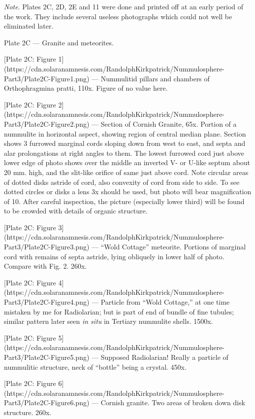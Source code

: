 \documentclass[a4paper, 12pt, oneside]{article}
\begin{document}
\emph{Note}. Plates 2C, 2D, 2E and 11 were done and printed off at an early period of the work. They include several useless photographs which could not well be eliminated later.

Plate 2C --- Granite and meteorites.

[Plate 2C: Figure 1](https://cdn.solaranamnesis.com/RandolphKirkpatrick/Nummulosphere-Part3/Plate2C-Figure1.png) --- Nummulitid pillars and chambers of Orthophragmina pratti, 110x. Figure of no value here.

[Plate 2C: Figure 2](https://cdn.solaranamnesis.com/RandolphKirkpatrick/Nummulosphere-Part3/Plate2C-Figure2.png) --- Section of Cornish Granite, 65x. Portion of a nummulite in horizontal aspect, showing region of central median plane. Section shows 3 furrowed marginal cords sloping down from west to east, and septa and alar prolongations at right angles to them. The lowest furrowed cord just above lower edge of photo shows over the middle an inverted V- or U-like septum about 20 mm. high, and the slit-like orifice of same just above cord. Note circular areas of dotted disks astride of cord, also convexity of cord from side to side. To see dotted circles or disks a lens 3x should be used, but photo will bear magnification of 10. After careful inspection, the picture (especially lower third) will be found to be crowded with details of organic structure.

[Plate 2C: Figure 3](https://cdn.solaranamnesis.com/RandolphKirkpatrick/Nummulosphere-Part3/Plate2C-Figure3.png) --- ``Wold Cottage'' meteorite. Portions of marginal cord with remains of septa astride, lying obliquely in lower half of photo. Compare with Fig. 2. 260x.

[Plate 2C: Figure 4](https://cdn.solaranamnesis.com/RandolphKirkpatrick/Nummulosphere-Part3/Plate2C-Figure4.png) --- Particle from ``Wold Cottage,'' at one time mistaken by me for Radiolarian; but is part of end of bundle of fine tubules; similar pattern later seen \emph{in situ} in Tertiary nummulite shells. 1500x.

[Plate 2C: Figure 5](https://cdn.solaranamnesis.com/RandolphKirkpatrick/Nummulosphere-Part3/Plate2C-Figure5.png) --- Supposed Radiolarian! Really a particle of nummulitic structure, neck of ``bottle'' being a crystal. 450x.

[Plate 2C: Figure 6](https://cdn.solaranamnesis.com/RandolphKirkpatrick/Nummulosphere-Part3/Plate2C-Figure6.png) --- Cornish granite. Two areas of broken down disk structure. 260x.
\end{document}
